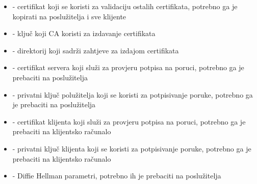         \begin{itemize}
        \item {} - certifikat koji se koristi za validaciju ostalih
        certifikata, potrebno ga je kopirati na poslužitelja i sve klijente
        \item {} - ključ koji CA koristi za izdavanje certifikata
        \item {} - direktorij koji sadrži zahtjeve za izdajom
        certifikata 
        \item {} - certifikat servera koji služi za
        provjeru potpisa na poruci, potrebno ga je prebaciti na poslužitelja
        \item {} - privatni ključ polužitelja
        koji se koristi za potpisivanje poruke, potrebno ga je prebaciti na
        poslužitelja
        \item {} - certifikat klijenta koji služi za
        provjeru potpisa na poruci, potrebno ga je prebaciti na klijentsko
        računalo
        \item {} - privatni ključ klijenta
        koji se koristi za potpisivanje poruke, potrebno ga je prebaciti na
        klijentsko računalo
        \item {} - Diffie Hellman parametri, potrebno ih je prebaciti na
        poslužitelja
        \end{itemize}



